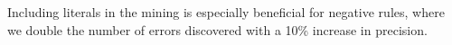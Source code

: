 

\noindent {} Including literals in the mining is especially beneficial for negative rules, where we double the number of errors discovered with a 10\% increase in precision.

